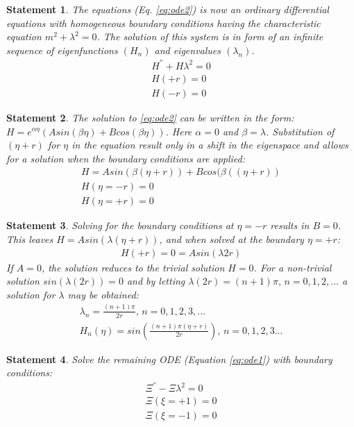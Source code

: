 \documentclass[10pt, reqno]{amsart}
\newtheorem{mydef}{Statement}
\begin{document}
\begin{mydef}
The equations (Eq. \ref{eq:ode2}) is now an ordinary differential equations with homogeneous boundary conditions having the  characteristic equation $m^2 + \lambda^2=0$. The solution of this system is in form of an infinite sequence of eigenfunctions $(H_n)$ and eigenvalues $(\lambda_n)$.
\begin{gather}
H^{''} + H\lambda^2 = 0 \\
\nonumber H(+r)=0\\
\nonumber H(-r)=0
\end{gather}
\end{mydef}

\begin{mydef}
The solution to \ref{eq:ode2} can be written in the form: $H=e^{\alpha \eta} \left( Asin(\beta \eta) + Bcos(\beta\eta) \right)$. Here $\alpha=0$ and $\beta=\lambda$. Substitution of $(\eta + r)$ for $\eta$ in the equation result only in a shift in the eigenspace and allows for a solution when the boundary conditions are applied:
\begin{gather*}
H=Asin(\beta (\eta + r)) + Bcos(\beta((\eta+r))\\
H(\eta = -r)=0\\
H(\eta = +r)=0
\end{gather*}
\end{mydef}

\begin{mydef}
Solving for the boundary conditions at $\eta = -r$ results in $B=0$. This leaves $H=Asin(\lambda(\eta + r))$, and when solved at the boundary $\eta = +r$:
\begin{gather}
H(+r)=0=Asin(\lambda2r)
\end{gather}
If $A=0$, the solution reduces to the trivial solution $H=0$. For a non-trivial solution $sin(\lambda(2r))=0$ and by letting $\lambda(2r)=(n+1)\pi, \, n=0,1,2,...$ a solution for $\lambda$ may be obtained:
\begin{gather}
\lambda_n=\frac{(n+1)\pi}{2r}, \, n=0,1,2,3,...\\
H_n(\eta)=sin\left(\frac{(n+1)\pi(\eta+r)}{2r}\right), \, n=0,1,2,3...
\end{gather}
\end{mydef}

\begin{mydef}
Solve the remaining ODE (Equation \ref{eq:ode1}) with boundary conditions:
\begin{gather}
\Xi^{''}-\Xi\lambda^2=0\\
\nonumber \Xi(\xi=+1)=0\\
\nonumber \Xi(\xi=-1)=0
\end{gather}
\end{mydef}
\end{document}
